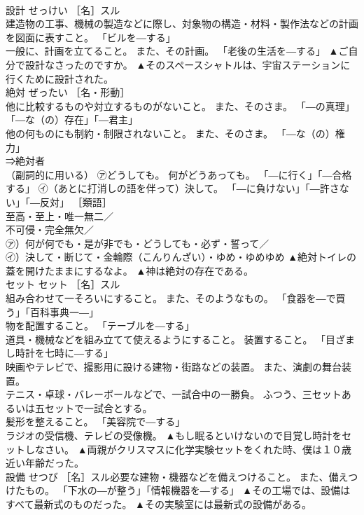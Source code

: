 \documentclass[8pt]{extreport}
\begin{document}
\begin{CJK}{UTF8}{min}
\\	設計	せっけい	［名］スル 
\\	建造物の工事、機械の製造などに際し、対象物の構造・材料・製作法などの計画を図面に表すこと。 「ビルを―する」 
\\	一般に、計画を立てること。 また、その計画。 「老後の生活を―する」	▲ご自分で設計なさったのですか。 ▲そのスペースシャトルは、宇宙ステーションに行くために設計された。
\\	絶対	ぜったい	［名・形動］ 
\\	他に比較するものや対立するものがないこと。 また、そのさま。 「―の真理」「―な（の）存在」「―君主」 
\\	他の何ものにも制約・制限されないこと。 また、そのさま。 「―な（の）権力」 
\\	⇒絶対者 
\\	（副詞的に用いる） ㋐どうしても。 何がどうあっても。 「―に行く」「―合格する」 ㋑（あとに打消しの語を伴って）決して。 「―に負けない」「―許さない」「―反対」 ［類語］
\\	至高・至上・唯一無二／
\\	不可侵・完全無欠／
\\	㋐）何が何でも・是が非でも・どうしても・必ず・誓って／
\\	㋑）決して・断じて・金輪際（こんりんざい）・ゆめ・ゆめゆめ	▲絶対トイレの蓋を開けたままにするなよ。 ▲神は絶対の存在である。
\\	セット	セット	［名］スル 
\\	組み合わせて一そろいにすること。 また、そのようなもの。 「食器を―で買う」「百科事典一―」 
\\	物を配置すること。 「テーブルを―する」 
\\	道具・機械などを組み立てて使えるようにすること。 装置すること。 「目ざまし時計を七時に―する」 
\\	映画やテレビで、撮影用に設ける建物・街路などの装置。 また、演劇の舞台装置。 
\\	テニス・卓球・バレーボールなどで、一試合中の一勝負。 ふつう、三セットあるいは五セットで一試合とする。 
\\	髪形を整えること。 「美容院で―する」 
\\	ラジオの受信機、テレビの受像機。	▲もし眠るといけないので目覚し時計をセットしなさい。 ▲両親がクリスマスに化学実験セットをくれた時、僕は１０歳近い年齢だった。
\\	設備	せつび	［名］スル必要な建物・機器などを備えつけること。 また、備えつけたもの。 「下水の―が整う」「情報機器を―する」	▲その工場では、設備はすべて最新式のものだった。 ▲その実験室には最新式の設備がある。

\end{CJK}
\end{document}
